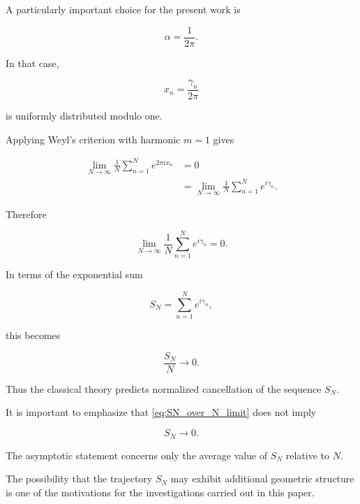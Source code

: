 \documentclass[11pt]{amsart}
\numberwithin{equation}{section}
\theoremstyle{plain}
\theoremstyle{definition}
\theoremstyle{remark}
\begin{document}
A particularly important choice for the present work is

\begin{equation}
\alpha
=
\frac{1}{2\pi}.
\label{eq:alpha_two_pi_inverse}
\end{equation}

In that case,

\begin{equation}
x_n
=
\frac{\gamma_n}{2\pi}
\label{eq:gamma_over_two_pi}
\end{equation}

is uniformly distributed modulo one.

Applying Weyl's criterion with harmonic \(m=1\) gives

\begin{align}
\lim_{N\to\infty}
\frac{1}{N}
\sum_{n=1}^{N}
e^{2\pi i x_n}
&=
0
\label{eq:weyl_application_first_harmonic}
\\
&=
\lim_{N\to\infty}
\frac{1}{N}
\sum_{n=1}^{N}
e^{i\gamma_n}.
\label{eq:weyl_application_SN}
\end{align}

Therefore

\begin{equation}
\lim_{N\to\infty}
\frac{1}{N}
\sum_{n=1}^{N}
e^{i\gamma_n}
=
0.
\label{eq:SN_normalized_cancellation}
\end{equation}

In terms of the exponential sum

\begin{equation}
S_N
=
\sum_{n=1}^{N}
e^{i\gamma_n},
\label{eq:SN_definition_hlawka}
\end{equation}

this becomes

\begin{equation}
\frac{S_N}{N}
\longrightarrow
0.
\label{eq:SN_over_N_limit}
\end{equation}

Thus the classical theory predicts normalized cancellation of the
sequence \(S_N\).

It is important to emphasize that
\eqref{eq:SN_over_N_limit}
does not imply

\begin{equation}
S_N
\longrightarrow
0.
\label{eq:SN_not_implied}
\end{equation}

The asymptotic statement concerns only the average value of
\(S_N\) relative to \(N\).

The possibility that the trajectory \(S_N\) may exhibit additional
geometric structure is one of the motivations for the investigations
carried out in this paper.
\end{document}
